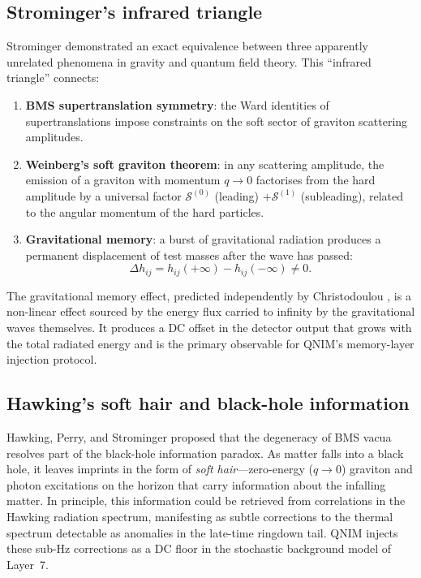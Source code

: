\documentclass[11pt,a4paper, english]{book}
\theoremstyle{plain}
\theoremstyle{definition}
\numberwithin{equation}{chapter}
\numberwithin{figure}{chapter}
\numberwithin{table}{chapter}
\begin{document}
\subsection{Strominger's infrared triangle}
\label{app:subsec:infrared-triangle}

Strominger \citeyear{Strominger_2016} demonstrated an exact equivalence between three apparently unrelated phenomena in gravity and quantum field theory. This ``infrared triangle'' connects:

\begin{enumerate}
  \item \textbf{BMS supertranslation symmetry}: the Ward identities of supertranslations impose constraints on the soft sector of graviton scattering amplitudes.
  \item \textbf{Weinberg's soft graviton theorem}: in any scattering amplitude, the emission of a graviton with momentum $q \to 0$ factorises from the hard amplitude by a universal factor $\mathcal{S}^{(0)}$ (leading) $+ \mathcal{S}^{(1)}$ (subleading), related to the angular momentum of the hard particles.
  \item \textbf{Gravitational memory}: a burst of gravitational radiation produces a permanent displacement of test masses after the wave has passed:
        \begin{equation}
          \label{eq:memory}
          \Delta h_{ij} = h_{ij}(+\infty) - h_{ij}(-\infty) \neq 0.
        \end{equation}
\end{enumerate}

The gravitational memory effect, predicted independently by Christodoulou \citeyear{Christodoulou_1991}, is a non-linear effect sourced by the energy flux carried to infinity by the gravitational waves themselves. It produces a DC offset in the detector output that grows with the total radiated energy and is the primary observable for QNIM's memory-layer injection protocol.

\subsection{Hawking's soft hair and black-hole information}
\label{app:subsec:soft-hair}

Hawking, Perry, and Strominger \cite{Hawking_2016} proposed that the degeneracy of BMS vacua resolves part of the black-hole information paradox. As matter falls into a black hole, it leaves imprints in the form of \emph{soft hair}---zero-energy ($q\to0$) graviton and photon excitations on the horizon that carry information about the infalling matter. In principle, this information could be retrieved from correlations in the Hawking radiation spectrum, manifesting as subtle corrections to the thermal spectrum detectable as anomalies in the late-time ringdown tail. QNIM injects these sub-Hz corrections as a DC floor in the stochastic background model of Layer~7.
\end{document}
